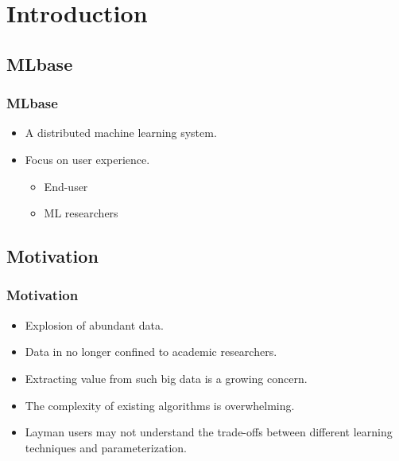 \section{Introduction}

\subsection{MLbase}
\begin{frame}
    \frametitle{MLbase}
	\begin{itemize}
		\item A distributed machine learning system. 
		\item Focus on user experience.
			\begin{itemize}
				\item End-user
				\item ML researchers
			\end{itemize}
	\end{itemize} 
\end{frame}

\subsection{Motivation}
\begin{frame}
    \frametitle{Motivation}
	\begin{itemize}
		\item Explosion of abundant data.  
		\item Data in no longer confined to academic researchers. 
		\item Extracting value from such big data is a growing concern. 
		\item The complexity of existing algorithms is overwhelming. 
		\item Layman users may not understand the trade-offs between different learning techniques and parameterization. 
	\end{itemize} 
\end{frame}

